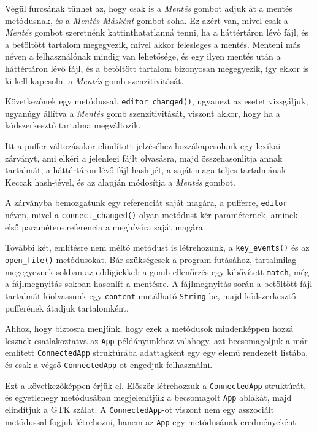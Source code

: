 Végül furcsának tűnhet az, hogy csak is a \textit{Mentés} gombot adjuk át a mentés metódusnak,
és a \textit{Mentés Másként} gombot soha.
Ez azért van, mivel csak a \textit{Mentés} gombot szeretnénk kattinthatatlanná tenni,
ha a háttértáron lévő fájl, és a betöltött tartalom megegyezik, mivel akkor felesleges a mentés.
Menteni más néven a felhasználónak mindig van lehetősége, és egy ilyen mentés után
a háttértáron lévő fájl, és a betöltött tartalom bizonyosan megegyezik, így ekkor is 
ki kell kapcsolni a \textit{Mentés} gomb szenzitivitását.

Következőnek egy metódussal, \texttt{editor\_changed()}, ugyanezt az esetet vizsgáljuk, ugyanúgy állítva a \textit{Mentés} gomb szenzitivitását,
viszont akkor, hogy ha a kódszerkesztő tartalma megváltozik. 



Itt a puffer változásakor elindított jelzéséhez hozzákapcsolunk egy lexikai zárványt,
ami elkéri a jelenlegi fájlt olvasásra, majd összehasonlítja annak tartalmát, a háttértáron lévő fájl hash-jét,
a saját maga teljes tartalmának Keccak hash-jével, és az alapján módosítja a \textit{Mentés} gombot.

A zárványba bemozgatunk egy referenciát saját magára, a pufferre, \texttt{editor} néven,
mivel a \texttt{connect\_changed()} olyan metódust kér paraméternek, aminek első paramétere
referencia a meghívóra saját magára.

További két, említésre nem méltó metódust is létrehozunk, a \texttt{key\_events()} és az \texttt{open\_file()} metódusokat.
Bár szükségesek a program futásához, tartalmilag megegyeznek sokban az eddigiekkel:
a gomb-ellenőrzés egy kibővített \texttt{match}, még a fájlmegnyitás sokban hasonlít a mentésre.
A fájlmegnyitás során a betöltött fájl tartalmát kiolvassunk egy \texttt{content} mutálható \texttt{String}-be,
majd kódszerkesztő pufferének átadjuk tartalomként.

Ahhoz, hogy biztosra menjünk, hogy ezek a metódusok mindenképpen hozzá lesznek csatlakoztatva
az \texttt{App} példányunkhoz valahogy, azt becsomagoljuk a már említett \texttt{ConnectedApp}
struktúrába adattagként egy egy elemű rendezett listába, és csak a végső \texttt{ConnectedApp}-ot
engedjük felhasználni.



Ezt a következőképpen érjük el. Először létrehozzuk a \texttt{ConnectedApp} struktúrát,
és egyetlenegy metódusában megjelenítjük a becsomagolt \texttt{App} ablakát, majd elindítjuk a GTK szálat.
A \texttt{ConnectedApp}-ot viszont nem egy asszociált metódussal fogjuk létrehozni,
hanem az \texttt{App} egy metódusának eredményeként.

